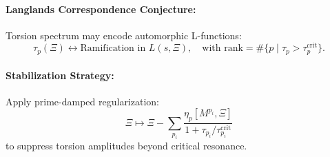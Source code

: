 \documentclass[12pt]{article}
\begin{document}
\paragraph{Langlands Correspondence Conjecture:} Torsion spectrum may encode automorphic L-functions:
\[
    \tau_p(\Xi) \longleftrightarrow \text{Ramification in } L(s, \Xi), \quad \text{with } \text{rank} = \#\{ p \mid \tau_p > \tau_p^{\text{crit}} \}.
\]

\paragraph{Stabilization Strategy:}
Apply prime-damped regularization:
\begin{equation}
    \Xi \mapsto \Xi - \sum_{p_i} \frac{\eta_p [M^{p_i}, \Xi]}{1 + \tau_{p_i}/\tau_{p_i}^{\text{crit}}}
\end{equation}
to suppress torsion amplitudes beyond critical resonance.


\nocite{*}


\end{document}
